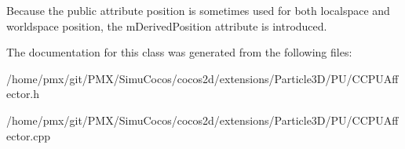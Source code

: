 Because the public attribute position is sometimes used for both localspace and worldspace position, the m\+Derived\+Position attribute is introduced. 

The documentation for this class was generated from the following files\+:\begin{DoxyCompactItemize}
\item 
/home/pmx/git/\+P\+M\+X/\+Simu\+Cocos/cocos2d/extensions/\+Particle3\+D/\+P\+U/C\+C\+P\+U\+Affector.\+h\item 
/home/pmx/git/\+P\+M\+X/\+Simu\+Cocos/cocos2d/extensions/\+Particle3\+D/\+P\+U/C\+C\+P\+U\+Affector.\+cpp\end{DoxyCompactItemize}
